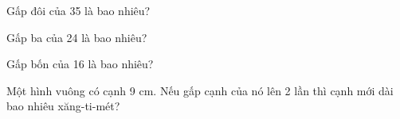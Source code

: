 \begin{ex}
Gấp đôi của 35 là bao nhiêu?
\end{ex}

\begin{ex}
Gấp ba của 24 là bao nhiêu?
\end{ex}

\begin{ex}
Gấp bốn của 16 là bao nhiêu?
\end{ex}

\begin{ex}
Một hình vuông có cạnh 9 cm. Nếu gấp cạnh của nó lên 2 lần thì cạnh mới dài bao nhiêu xăng-ti-mét?
\end{ex}
